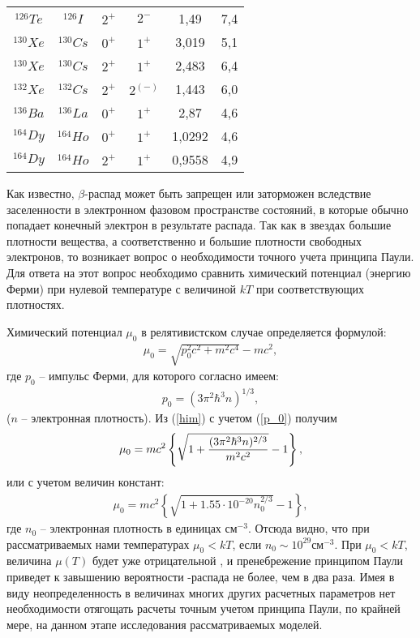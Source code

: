 \begin{table}
\begin{tabular}{|c|c|c|c|c|c|}
  $^{126}Te$ & $^{126}I$  & $2^+$  &  $2^-$  & 1,49 &   7,4   \\
  $^{130}Xe$ & $^{130}Cs$ & $0^+$  &  $1^+$  & 3,019 &   5,1   \\
  $^{130}Xe$ & $^{130}Cs$ & $2^+$  &  $1^+$  & 2,483 &   6,4   \\
  $^{132}Xe$ & $^{132}Cs$ & $2^+$  &  $2^{(-)}$  & 1,443 &   6,0   \\
  $^{136}Ba$ & $^{136}La$ & $0^+$  &  $1^+$  & 2,87 &   4,6   \\
  $^{164}Dy$ & $^{164}Ho$ & $0^+$  &  $1^+$  & 1,0292 &   4,6   \\
  $^{164}Dy$ & $^{164}Ho$ & $2^+$  &  $1^+$  & 0,9558 &   4,9   \\
  \hline
\end{tabular}
\label{Tels}
\end{table}

Как известно, $\beta$-распад может быть запрещен или заторможен вследствие
заселенности в электронном фазовом пространстве состояний,
в которые обычно попадает конечный
электрон в результате распада. Так как в звездах большие плотности вещества,
а соответственно
и большие плотности свободных электронов, то возникает вопрос о необходимости
точного учета принципа Паули. Для ответа на этот вопрос необходимо сравнить
химический потенциал (энергию Ферми) при нулевой температуре  с
величиной $kT$ при соответствующих плотностях.

Химический потенциал $\mu_0$ в релятивистском случае определяется формулой:
\begin{eqnarray}\label{him}
\mu_0=\sqrt{p_0^2 c^2+m^2 c^4}-mc^2,
\end{eqnarray}
где $p_0$ -- импульс Ферми, для которого согласно \cite{LL_stat} имеем:
\begin{eqnarray}\label{p_0}
p_0=({3\pi^2 \hbar^3 n})^{1/3},
\end{eqnarray}
($n$ -- электронная плотность).
Из (\ref{him}) с учетом (\ref{p_0}) получим
\begin{eqnarray}\label{him2}
\mu_0=m c^2\left \{\sqrt{1+ {{({3\pi^2 \hbar^3 n})^{2/3}}\over{m^2 c^2}} }-1\right \},
\end{eqnarray}
или с учетом величин констант:
\begin{eqnarray}\label{him3}
\mu_0=m c^2\left \{\sqrt{1+ 1.55\cdot 10^{-20} n_0^{2/3}}-1\right \},
\end{eqnarray}
где $n_0$ -- электронная плотность в единицах $см^{-3}$.  Отсюда  видно, что при рассматриваемых нами температурах $\mu_0
< kT$, если $n_0\sim 10^{29} см^{-3}$. При $\mu_0 < kT$, величина $\mu (T)$ будет уже отрицательной \cite{kubo}, и
пренебрежение принципом Паули приведет к завышению вероятности \be-распада не более, чем  в два раза. Имея в виду
неопределенность в величинах многих других расчетных параметров нет необходимости отягощать расчеты точным учетом
принципа Паули, по крайней мере, на данном этапе исследования рассматриваемых моделей.


